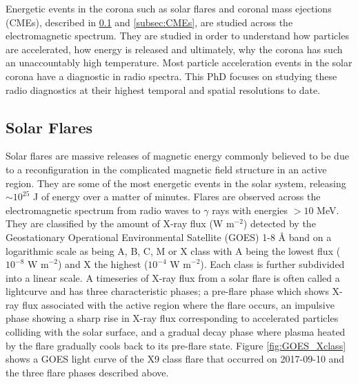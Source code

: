 Energetic events in the corona such as solar flares and coronal mass ejections (CMEs), described in \ref{subsec:sf} and \ref{subsec:CMEs}, are studied across the electromagnetic spectrum. They are studied in order to understand how particles are accelerated, how energy is released and ultimately, why the corona has such an unaccountably high temperature.
Most particle acceleration events in the solar corona have a diagnostic in radio spectra. This PhD focuses on studying these radio diagnostics at their highest temporal and spatial resolutions to date.

\subsection{Solar Flares}
\label{subsec:sf}
Solar flares are massive releases of magnetic energy commonly believed to be due to a reconfiguration in the complicated magnetic field structure in an active region.  They are some of the most energetic events in the solar system, releasing $\sim 10^{25}$ J of energy over a matter of minutes. Flares are observed across the electromagnetic spectrum from radio waves to $\gamma$ rays with energies $> 10$ MeV. They are classified by the amount of X-ray flux (W m$^{-2}$) detected by the Geostationary Operational Environmental Satellite (GOES) 1-8 {\AA} band on a logarithmic scale as being A, B, C, M or X class with A being the lowest flux ($10^{-8} \mbox{ W m}^{-2}$) and X the highest ($10^{-4} \mbox{ W m}^{-2}$). Each class is further subdivided into a linear scale.
A timeseries of X-ray flux from a solar flare is often called a lightcurve and has three characteristic phases; a pre-flare phase which shows X-ray flux associated with the active region where the flare occurs, an impulsive phase showing a sharp rise in X-ray flux corresponding to accelerated particles colliding with the solar surface, and a gradual decay phase where plasma heated by the flare gradually cools back to its pre-flare state. Figure \ref{fig:GOES_Xclass} shows a GOES light curve of the X9 class flare that occurred on 2017-09-10 and the three flare phases described above.


